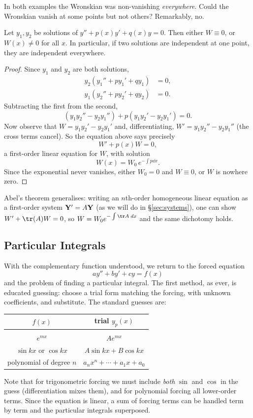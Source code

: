 \documentclass[a4paper]{scrartcl}
\begin{document}
In both examples the Wronskian was non-vanishing \emph{everywhere}. Could the Wronskian vanish at some points but not others? Remarkably, no.

\begin{theorem}
	Let $y_1, y_2$ be solutions of $y'' + p(x) y' + q(x) y = 0$. Then either $W \equiv 0$, or $W(x) \neq 0$ for all $x$. In particular, if two solutions are independent at one point, they are independent everywhere.
\end{theorem}
\begin{proof}
	Since $y_1$ and $y_2$ are both solutions,
	\begin{align*}
		y_2 (y_1'' + p y_1' + q y_1) &= 0, \\
		y_1 (y_2'' + p y_2' + q y_2) &= 0.
	\end{align*}
	Subtracting the first from the second,
	$$
	(y_1 y_2'' - y_2 y_1'') + p (y_1 y_2' - y_2 y_1') = 0.
	$$
	Now observe that $W = y_1 y_2' - y_2 y_1'$ and, differentiating, $W' = y_1 y_2'' - y_2 y_1''$ (the cross terms cancel). So the equation above says precisely
	$$
	W' + p(x) W = 0,
	$$
	a first-order linear equation for $W$, with solution
	$$
	W(x) = W_0 \, e^{-\int p \dd x}.
	$$
	Since the exponential never vanishes, either $W_0 = 0$ and $W \equiv 0$, or $W$ is nowhere zero.
\end{proof}

\begin{remark}
	Abel's theorem generalises: writing an $n$th-order homogeneous linear equation as a first-order system $\mathbf{Y}' = A \mathbf{Y}$ (as we will do in \S\ref{sec:systems}), one can show $W' + \tr(A) W = 0$, so $W = W_0 e^{-\int \tr A \dd x}$ and the same dichotomy holds.
\end{remark}

\subsection{Particular Integrals}

With the complementary function understood, we return to the forced equation
$$
a y'' + by' + cy = f(x)
$$
and the problem of finding a particular integral. The first method, as ever, is educated guessing: choose a trial form matching the forcing, with unknown coefficients, and substitute. The standard guesses are:
\begin{center}
	\begin{tabular}{cc}
		$f(x)$ & trial $y_p(x)$ \\[2pt]
		\hline \\[-8pt]
		$e^{mx}$ & $A e^{mx}$ \\
		$\sin kx$ or $\cos kx$ & $A \sin kx + B \cos kx$ \\
		polynomial of degree $n$ & $a_n x^n + \cdots + a_1 x + a_0$
	\end{tabular}
\end{center}
Note that for trigonometric forcing we must include \emph{both} $\sin$ and $\cos$ in the guess (differentiation mixes them), and for polynomial forcing all lower-order terms. Since the equation is linear, a sum of forcing terms can be handled term by term and the particular integrals superposed.
\end{document}
